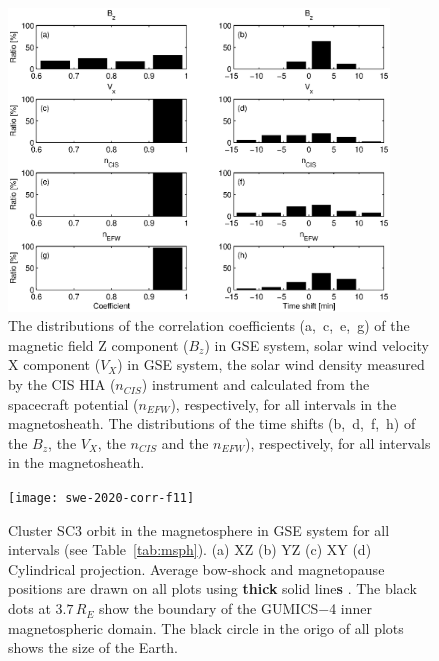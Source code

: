 \documentclass[linenumbers,draft]{agujournal}
\begin{document}
\begin{figure}[h]
\centering
\includegraphics[width=0.9\textwidth,angle=0]{swe-2020-corr-f10}
\caption{The distributions of the correlation coefficients (a,~c,~e,~g) of the magnetic field Z component ($B_z$) in GSE system, solar wind velocity X component ($V_X$) in GSE system, the solar wind density measured by the CIS HIA ($n_{CIS}$) instrument and calculated from the spacecraft potential ($n_{EFW}$), respectively, for all intervals in the magnetosheath. The distributions of the time shifts (b,~d,~f,~h) of the $B_z$, the $V_X$, the $n_{CIS}$ and the $n_{EFW}$), respectively, for all intervals in the magnetosheath.}
\label{fig:mshcorrplot}
\end{figure}

\pagebreak

\begin{figure}[h]
\centering
\texttt{[image: swe-2020-corr-f11]}  
\caption{Cluster SC3 orbit in the magnetosphere in GSE system for all intervals (see Table~\ref{tab:msph}). (a) XZ (b) YZ (c) XY (d) Cylindrical projection. Average bow-shock and magnetopause positions are drawn on all plots using \textbf{thick} solid line\textbf{s} \citep[][respectively]{peredo95:_three_alfven_mach,tsyganenko95:_model_earth}. The black dots at $3.7\,R_E$ show the boundary of the GUMICS$-$4 inner magnetospheric domain. The black circle in the origo of all plots shows the size of the Earth.}
\label{fig:msphorbit}
\end{figure}

\pagebreak
\end{document}
